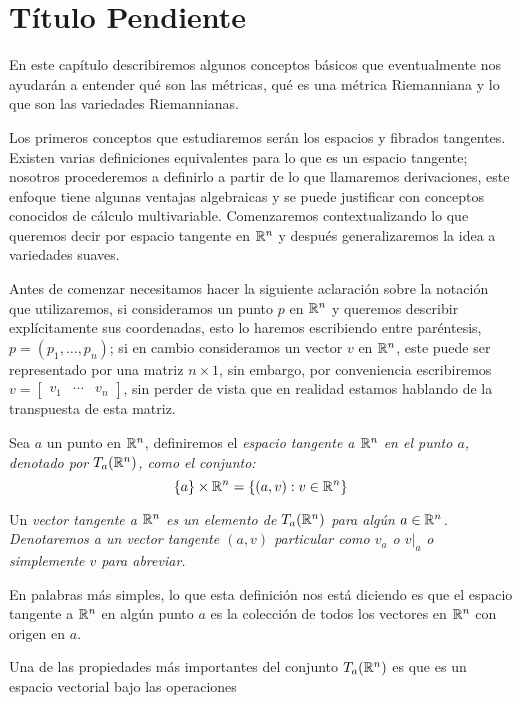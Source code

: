 \chapter{Título Pendiente}\label{Capítulo: Conceptos Básicos}
En este capítulo describiremos algunos conceptos básicos que eventualmente nos ayudarán a entender qué son las métricas, qué es una métrica Riemanniana y lo que son las variedades Riemannianas.

Los primeros conceptos que estudiaremos serán los espacios y fibrados tangentes. Existen varias definiciones equivalentes para lo que es un espacio tangente; nosotros procederemos a definirlo a partir de lo que llamaremos derivaciones, este enfoque tiene algunas ventajas algebraicas y se puede justificar con conceptos conocidos de cálculo multivariable. Comenzaremos contextualizando lo que queremos decir por espacio tangente en $\mathbb{R}^n$ y después generalizaremos la idea a variedades suaves.

Antes de comenzar necesitamos hacer la siguiente aclaración sobre la notación que utilizaremos, si consideramos un punto $p$ en $\mathbb{R}^n$ y queremos describir explícitamente sus coordenadas, esto lo haremos escribiendo entre paréntesis, $p = (p_1, \ldots, p_n)$; si en cambio consideramos un vector $v$ en $\mathbb{R}^n$, este puede ser representado por una matriz $n \times 1$, sin embargo, por conveniencia escribiremos $v = \begin{bmatrix} v_1 & \cdots & v_n \end{bmatrix}$, sin perder de vista que en realidad estamos hablando de la transpuesta de esta matriz.

\begin{definition}\label{Definición: Espacio Tangente en Rn}
	Sea $a$ un punto en $\mathbb{R}^n$, definiremos el \it{espacio tangente a $\mathbb{R}^n$ en el punto $a$}, denotado por $T_a(\mathbb{R}^n)$, como el conjunto:
	\[ \{a\} \times \mathbb{R}^n = \{(a,v): v \in \mathbb{R}^n\} \]

	Un \it{vector tangente} a $\mathbb{R}^n$ es un elemento de $T_a(\mathbb{R}^n)$ para algún $a \in \mathbb{R}^n$. Denotaremos a un vector tangente $(a,v)$ particular como $v_a$ o $v|_a$ o simplemente $v$ para abreviar.
\end{definition}

En palabras más simples, lo que esta definición nos está diciendo es que el espacio tangente a $\mathbb{R}^n$ en algún punto $a$ es la colección de todos los vectores en $\mathbb{R}^n$ con origen en $a$.

Una de las propiedades más importantes del conjunto $T_a(\mathbb{R}^n)$ es que es un espacio vectorial bajo las operaciones

